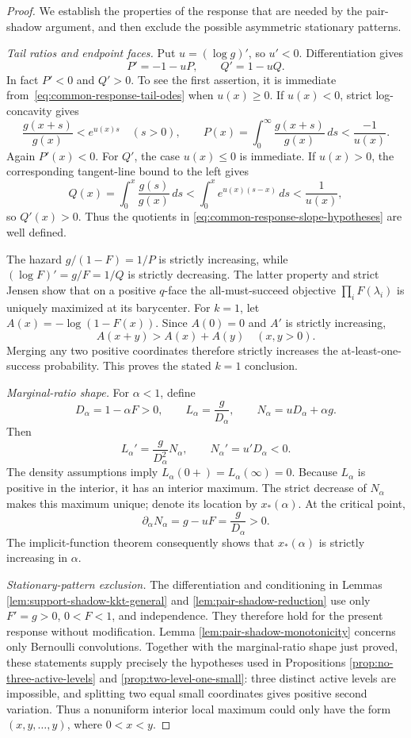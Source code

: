\documentclass[11pt]{article}
\theoremstyle{definition}
\theoremstyle{remark}
\newcommand{\1}{\mathbf 1}
\begin{document}
\begin{proof}
We establish the properties of the response that are needed by the
pair-shadow argument, and then exclude the possible asymmetric
stationary patterns.

\medskip\noindent\emph{Tail ratios and endpoint faces.}
Put \(u=(\log g)'\), so \(u'<0\).  Differentiation gives
\begin{equation}\label{eq:common-response-tail-odes}
  P'=-1-uP,\qquad Q'=1-uQ.
\end{equation}
In fact \(P'<0\) and \(Q'>0\).  To see the first assertion, it is
immediate from~\eqref{eq:common-response-tail-odes} when \(u(x)\ge0\).
If \(u(x)<0\), strict log-concavity gives
\[
  \frac{g(x+s)}{g(x)}<e^{u(x)s}\quad(s>0),
  \qquad
  P(x)=\int_0^\infty\frac{g(x+s)}{g(x)}\,ds<\frac{-1}{u(x)}.
\]
Again \(P'(x)<0\).  For \(Q'\), the case \(u(x)\le0\) is
immediate.  If \(u(x)>0\), the corresponding tangent-line bound
to the left gives
\[
  Q(x)=\int_0^x\frac{g(s)}{g(x)}\,ds
       <\int_0^x e^{u(x)(s-x)}\,ds<\frac1{u(x)},
\]
so \(Q'(x)>0\).  Thus the quotients in
\eqref{eq:common-response-slope-hypotheses} are well defined.

The hazard \(g/(1-F)=1/P\) is strictly increasing, while
\((\log F)'=g/F=1/Q\) is strictly decreasing.  The latter property
and strict Jensen show that on a positive \(q\)-face the
all-must-succeed objective \(\prod_iF(\lambda_i)\) is uniquely
maximized at its barycenter.  For \(k=1\), let
\(A(x)=-\log(1-F(x))\).  Since \(A(0)=0\) and \(A'\) is strictly
increasing,
\[
  A(x+y)>A(x)+A(y)\quad(x,y>0).
\]
Merging any two positive coordinates therefore strictly increases
the at-least-one-success probability.  This proves the stated
\(k=1\) conclusion.

\medskip\noindent\emph{Marginal-ratio shape.}
For \(\alpha<1\), define
\[
  D_\alpha=1-\alpha F>0,
  \qquad L_\alpha=\frac g{D_\alpha},
  \qquad N_\alpha=uD_\alpha+\alpha g.
\]
Then
\[
  L_\alpha'=\frac g{D_\alpha^2}N_\alpha,
  \qquad N_\alpha'=u'D_\alpha<0.
\]
The density assumptions imply
\(L_\alpha(0+)=L_\alpha(\infty)=0\).  Because \(L_\alpha\) is
positive in the interior, it has an interior maximum.  The strict
decrease of \(N_\alpha\) makes this maximum unique; denote its
location by \(x_*(\alpha)\).  At the critical point,
\[
  \partial_\alpha N_\alpha=g-uF=\frac g{D_\alpha}>0.
\]
The implicit-function theorem consequently shows that
\(x_*(\alpha)\) is strictly increasing in \(\alpha\).

\medskip\noindent\emph{Stationary-pattern exclusion.}
The differentiation and conditioning in Lemmas
\ref{lem:support-shadow-kkt-general} and \ref{lem:pair-shadow-reduction}
use only \(F'=g>0\), \(0<F<1\), and independence. They therefore hold
for the present response without modification. Lemma
\ref{lem:pair-shadow-monotonicity} concerns only Bernoulli convolutions.
Together with the marginal-ratio shape just proved, these statements
supply precisely the hypotheses used in Propositions
\ref{prop:no-three-active-levels} and \ref{prop:two-level-one-small}:
three distinct active levels are impossible, and splitting two equal
small coordinates gives positive second variation. Thus a nonuniform
interior local maximum could only have the form \((x,y,\ldots,y)\),
where \(0<x<y\).


\end{proof}
\end{document}
